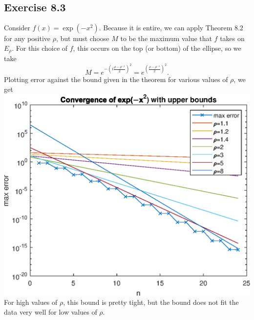 \documentclass{article}
\begin{document}
\subsection{Exercise 8.3}
Consider $f(x)=\exp(-x^2)$. Because it is entire, we can apply Theorem 8.2 for any positive $\rho$, but must choose $M$ to be the maximum value that $f$ takes on $E_\rho$. For this choice of $f$, this occurs on the top (or bottom) of the ellipse, so we take 
\[
M=e^{-(i\frac{\rho-\rho^{-1}}{2})^2}=e^{(\frac{\rho-\rho^{-1}}{2})^2}.
\]
Plotting error against the bound given in the theorem for various values of $\rho$, we get\\
\includegraphics[]{prob8-3.eps}\\
For high values of $\rho$, this bound is pretty tight, but the bound does not fit the data very well for low values of $\rho$.
\end{document}
